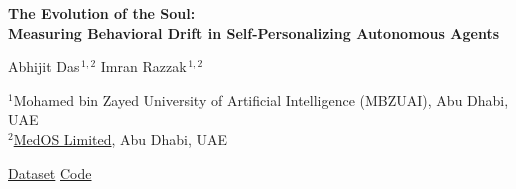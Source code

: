 \documentclass[11pt,a4paper]{article}
\begin{document}
\thispagestyle{empty}

\vspace*{16pt}
\begin{center}
{\LARGE\bfseries The Evolution of the Soul:\\[3pt]
Measuring Behavioral Drift in Self-Personalizing Autonomous Agents\par}
\vspace{15pt}
{\large Abhijit Das$^{\,1,2}$ \qquad\quad Imran Razzak$^{\,1,2}$\par}
\vspace{5pt}
{\small $^{1}$Mohamed bin Zayed University of Artificial Intelligence
(MBZUAI), Abu Dhabi, UAE\\[1pt]
$^{2}$\href{https://www.medos.tech}{MedOS Limited}, Abu Dhabi, UAE\\[6pt]
{\footnotesize\faDatabase\;\href{https://huggingface.co/datasets/abhijit2k01/evolution-of-the-soul}{Dataset}\qquad
\faGithub\;\href{https://github.com/aj-das-research/AiSafety}{Code}\par}}
\vspace{5pt}
\end{center}
\end{document}
